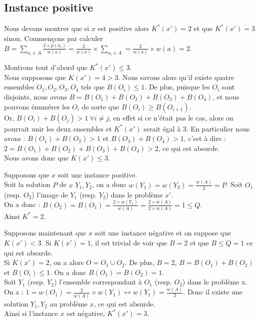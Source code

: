 \subsection{Instance positive}\label{ex10_q3}
Nous devons montrer que si $x$ est positive alors $K^*(x') = 2$ et que $K^*(x') = 3$
sinon.
Commençons par calculer $B = \sum_{a_i \in A} \frac{2 \times p(a_i)}{w(a)} =
\frac{2}{w(a)} \times \sum_{a_{i} \in A} = \frac{2}{w(a)} \times w(a) = 2$.

Montrons tout d'abord que $K^*(x') \leq 3$.\\
Nous supposons que $K(x') = 4 > 3$. Nous savons alors qu'il existe quatre ensembles
$O_1,O_2,O_3,O_4$ tels que $B(O_i) \leq 1$.
De plus, puisque les $O_i$ sont disjoints, nous avons $B = B(O_1)+B(O_2)+B(O_3)+B(O_4)$,
et nous pouvons énumérer les $O_i$ de sorte que $B(O_i) \geq B(O_{i+1})$.\\
Or, $B(O_i) + B(O_j) > 1\ \forall i \neq j$, en effet si ce n'était pas le cas, alors on
pourrait unir les deux ensembles et $K^*(x')$ serait égal à 3.
En particulier nous avons : $B(O_1)+B(O_2) > 1$ et $B(O_3)+B(O_4) > 1$, c'est à dire :
$2 = B(O_1) + B(O_2) + B(O_3) + B(O_4) > 2$, ce qui est absurde.\\
Nous avons donc que $K(x') \leq 3$.

Supposons que $x$ soit une instance positive.\\
Soit la solution $P$ de $x$ $Y_1,Y_2$, on a donc $w(Y_1) = w(Y_2) = \frac{w(A)}{2} = P$.
Soit $O_1$ (resp. $O_2$) l'image de $Y_1$ (resp. $Y_2$) dans le problème $x'$.\\
On a donc : $B(O_2) = B(O_1) = \frac{2 \times w(Y_1)}{w(A)} = \frac{2 \times w(A)}{2
\times w(A)} = 1 \leq Q$.\\
Ainsi $K^* = 2$.

Supposons maintenant que $x$ soit une instance négative et on suppose que $K(x') < 3$.
Si $K(x') = 1$, il est trivial de voir que $B = 2$ et que $B \leq Q = 1$ ce qui est
absurde.\\
Si $K(x') = 2$, on a alors $O = O_1 \cup O_2$. 
De plus, $B = 2$, $B = B(O_1) + B(O_2)$ et $B(O_i) \leq 1$.
On a donc $B(O_1) = B(O_2) = 1$.\\
Soit $Y_1$ (resp. $Y_2$) l'ensemble correspondant à $O_1$ (resp. $O_2$) dans le problème
x. On a :
$1 = w(O_1) = \frac{2}{w(A)} \times w(Y_1) \leftrightarrow w(Y_1) = \frac{w(A)}{2}$.
Donc il existe une solution $Y_1,Y_2$ au problème $x$, ce qui est absurde.\\
Ainsi si l'instance $x$ est négative, $K^*(x') = 3$.

